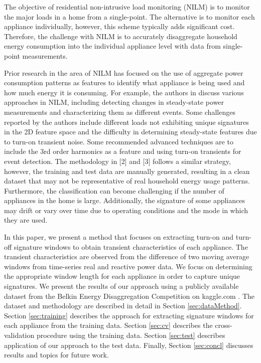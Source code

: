 \documentclass[conference]{IEEEtran}
\begin{document}
The objective of residential non-intrusive load monitoring (NILM) is to monitor the major loads in a home from a single-point.  The alternative is to monitor each appliance individually, however, this scheme typically adds significant cost. Therefore, the challenge with NILM is to accurately disaggregate household energy consumption into the individual appliance level with data from single-point measurements.  

Prior research in the area of NILM has focused on the use of aggregate power consumption patterns as features to identify what appliance is being used and how much energy it is consuming. For example, the authors in \cite{mit} discuss various approaches in NILM, including detecting changes in steady-state power measurements and characterizing them as different events. Some challenges reported by the authors include different loads not exhibiting unique signatures in the 2D feature space and the difficulty in determining steady-state features due to turn-on transient noise.  Some recommended advanced techniques are to include the 3rd order harmonics as a feature and using turn-on transients for event detection.  The methodology in [2] and [3] follows a similar strategy, however, the training and test data are manually generated, resulting in a clean dataset that may not be representative of real household energy usage patterns.  Furthermore, the classification can become challenging if the number of appliances in the home is large. Additionally, the signature of some appliances may drift or vary over time due to operating conditions and the mode in which they are used. 

In this paper, we present a method that focuses on extracting turn-on and turn-off signature windows to obtain transient characteristics of each appliance.  The transient characteristics are observed from the difference of two moving average windows from time-series real and reactive power data.  We focus on determining the appropriate window length for each appliance in order to capture unique signatures.  We present the results of our approach using a publicly available dataset from the Belkin Energy Disaggregation Competition on kaggle.com \cite{Kaggle}. The dataset and methodology are described in detail in Section \ref{sec:dataMethod}.  Section \ref{sec:training} describes the approach for extracting signature windows for each appliance from the training data. Section \ref{sec:cv} describes the cross-validation procedure using the training data.  Section \ref{sec:test} describes application of our approach to the test data.  Finally, Section \ref{sec:concl} discusses results and topics for future work.
%
\end{document}
